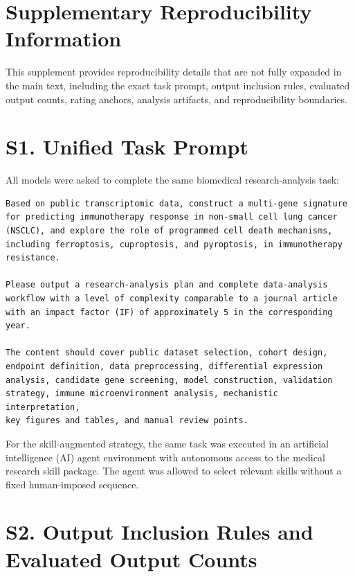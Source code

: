 \setcounter{table}{0}
\renewcommand{\thetable}{S\arabic{table}}

\section{Supplementary Reproducibility Information}

This supplement provides reproducibility details that are not fully expanded in the main text, including the exact task prompt, output inclusion rules, evaluated output counts, rating anchors, analysis artifacts, and reproducibility boundaries.

\section{S1. Unified Task Prompt}

All models were asked to complete the same biomedical research-analysis task:

\begin{verbatim}
Based on public transcriptomic data, construct a multi-gene signature
for predicting immunotherapy response in non-small cell lung cancer
(NSCLC), and explore the role of programmed cell death mechanisms,
including ferroptosis, cuproptosis, and pyroptosis, in immunotherapy
resistance.

Please output a research-analysis plan and complete data-analysis
workflow with a level of complexity comparable to a journal article
with an impact factor (IF) of approximately 5 in the corresponding year.

The content should cover public dataset selection, cohort design,
endpoint definition, data preprocessing, differential expression
analysis, candidate gene screening, model construction, validation
strategy, immune microenvironment analysis, mechanistic interpretation,
key figures and tables, and manual review points.
\end{verbatim}

For the skill-augmented strategy, the same task was executed in an artificial intelligence (AI) agent environment with autonomous access to the medical research skill package. The agent was allowed to select relevant skills without a fixed human-imposed sequence.

\section{S2. Output Inclusion Rules and Evaluated Output Counts}

